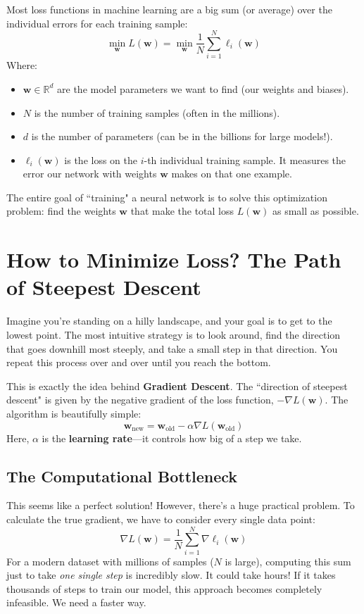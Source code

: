 \documentclass[11pt, a4paper]{article}
\begin{document}
Most loss functions in machine learning are a big sum (or average) over the individual errors for each training sample:
\begin{equation}
\min_{\mathbf{w}} L(\mathbf{w}) = \min_{\mathbf{w}} \frac{1}{N} \sum_{i=1}^{N} \ell_i(\mathbf{w})
\end{equation}
Where:
\begin{itemize}
    \item $\mathbf{w} \in \mathbb{R}^d$ are the model parameters we want to find (our weights and biases).
    \item $N$ is the number of training samples (often in the millions).
    \item $d$ is the number of parameters (can be in the billions for large models!).
    \item $\ell_i(\mathbf{w})$ is the loss on the $i$-th individual training sample. It measures the error our network with weights $\mathbf{w}$ makes on that one example.
\end{itemize}
The entire goal of ``training" a neural network is to solve this optimization problem: find the weights $\mathbf{w}$ that make the total loss $L(\mathbf{w})$ as small as possible.

\section{How to Minimize Loss? The Path of Steepest Descent}
Imagine you're standing on a hilly landscape, and your goal is to get to the lowest point. The most intuitive strategy is to look around, find the direction that goes downhill most steeply, and take a small step in that direction. You repeat this process over and over until you reach the bottom.

This is exactly the idea behind \textbf{Gradient Descent}. The ``direction of steepest descent" is given by the negative gradient of the loss function, $-\nabla L(\mathbf{w})$. The algorithm is beautifully simple:
\begin{equation}
\mathbf{w}_{\text{new}} = \mathbf{w}_{\text{old}} - \alpha \nabla L(\mathbf{w}_{\text{old}})
\end{equation}
Here, $\alpha$ is the \textbf{learning rate}—it controls how big of a step we take.

\subsection{The Computational Bottleneck}
This seems like a perfect solution! However, there's a huge practical problem. To calculate the true gradient, we have to consider every single data point:
\begin{equation}
\nabla L(\mathbf{w}) = \frac{1}{N} \sum_{i=1}^{N} \nabla \ell_i(\mathbf{w})
\end{equation}
For a modern dataset with millions of samples ($N$ is large), computing this sum just to take \emph{one single step} is incredibly slow. It could take hours! If it takes thousands of steps to train our model, this approach becomes completely infeasible. We need a faster way.
\end{document}
